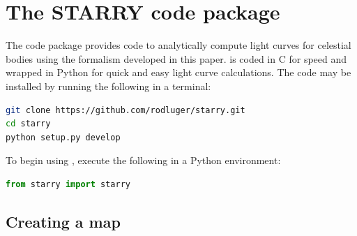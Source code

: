 \documentclass[modern]{aastex61}
\begin{document}
\section{The \textbf{STARRY} code package}
\label{sec:starrycode}

The \starry code package provides code to analytically
compute light curves for celestial bodies using the formalism developed
in this paper. \starry is coded in \textsf{C} for speed and wrapped
in \textsf{Python} for quick and easy light curve calculations. The
code may be installed by running the following in a terminal:
%
\begin{lstlisting}[language=bash]
git clone https://github.com/rodluger/starry.git
cd starry
python setup.py develop
\end{lstlisting}
%
To begin using \starry, execute the following in a \textsf{Python} environment:
%
\begin{lstlisting}[language=Python]
from starry import starry
\end{lstlisting}
%

\subsection{Creating a map}
\label{sec:starrymap}
\end{document}
